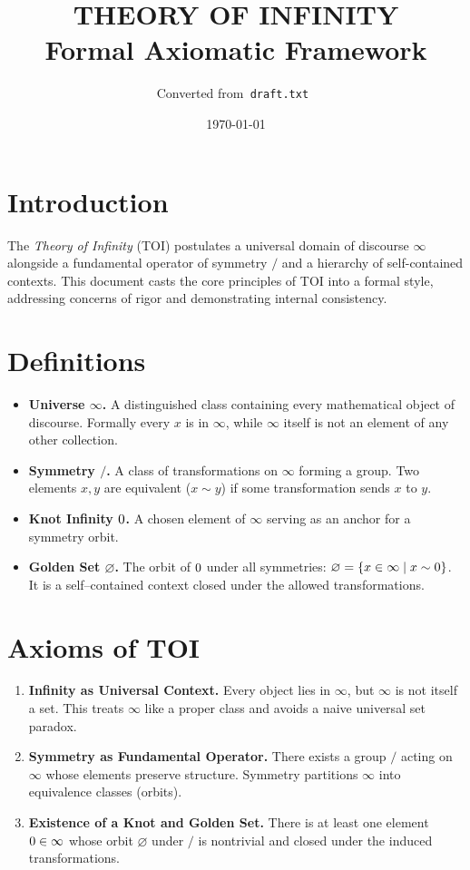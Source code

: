\documentclass[11pt]{article}
\title{\Huge\bfseries THEORY OF INFINITY\\[0.5em] \Large Formal Axiomatic Framework}
\author{Converted from\texttt{ draft.txt }}
\date{\today}
\newcommand{\symtry}{\mathbin{/}}
\newcommand{\goldenset}{\varnothing}
\newcommand{\knotinfinity}{\textnormal{0}}
\begin{document}
\maketitle

\section*{Introduction}
The \emph{Theory of Infinity} (TOI) postulates a universal domain of discourse $\infty$ alongside a fundamental operator of symmetry $\symtry$ and a hierarchy of self-contained contexts.  This document casts the core principles of TOI into a formal style, addressing concerns of rigor and demonstrating internal consistency.

\section*{Definitions}
\begin{itemize}
  \item \textbf{Universe $\infty$.}  A distinguished class containing every mathematical object of discourse.  Formally every $x$ is in $\infty$, while $\infty$ itself is not an element of any other collection.
  \item \textbf{Symmetry $\symtry$.}  A class of transformations on $\infty$ forming a group.  Two elements $x,y$ are equivalent ($x\sim y$) if some transformation sends $x$ to $y$.
  \item \textbf{Knot Infinity $\knotinfinity$.}  A chosen element of $\infty$ serving as an anchor for a symmetry orbit.
  \item \textbf{Golden Set $\goldenset$.}  The orbit of $\knotinfinity$ under all symmetries: $\goldenset=\{x\in\infty\mid x\sim \knotinfinity\}$.  It is a self--contained context closed under the allowed transformations.
\end{itemize}

\section*{Axioms of TOI}
\begin{enumerate}
  \item \textbf{Infinity as Universal Context.}  Every object lies in $\infty$, but $\infty$ is not itself a set.  This treats $\infty$ like a proper class and avoids a naive universal set paradox.
  \item \textbf{Symmetry as Fundamental Operator.}  There exists a group $\symtry$ acting on $\infty$ whose elements preserve structure.  Symmetry partitions $\infty$ into equivalence classes (orbits).
  \item \textbf{Existence of a Knot and Golden Set.}  There is at least one element $\knotinfinity\in \infty$ whose orbit $\goldenset$ under $\symtry$ is nontrivial and closed under the induced transformations.
\end{enumerate}
\end{document}
